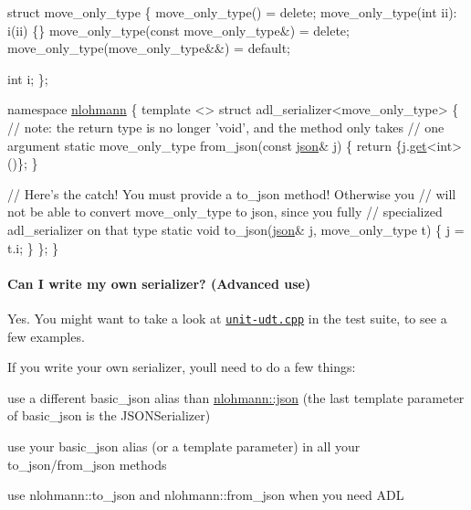 \begin{DoxyCode}
\textcolor{keyword}{struct }move\_only\_type \{
    move\_only\_type() = \textcolor{keyword}{delete};
    move\_only\_type(\textcolor{keywordtype}{int} ii): i(ii) \{\}
    move\_only\_type(\textcolor{keyword}{const} move\_only\_type&) = \textcolor{keyword}{delete};
    move\_only\_type(move\_only\_type&&) = \textcolor{keywordflow}{default};

    \textcolor{keywordtype}{int} i;
\};

\textcolor{keyword}{namespace }\hyperlink{namespacenlohmann}{nlohmann} \{
    \textcolor{keyword}{template} <>
    \textcolor{keyword}{struct }adl\_serializer<move\_only\_type> \{
        \textcolor{comment}{// note: the return type is no longer 'void', and the method only takes}
        \textcolor{comment}{// one argument}
        \textcolor{keyword}{static} move\_only\_type from\_json(\textcolor{keyword}{const} \hyperlink{classnlohmann_1_1basic__json}{json}& j) \{
            \textcolor{keywordflow}{return} \{j.\hyperlink{classnlohmann_1_1basic__json_a6b187a22994c12c8cae0dd5ee99dc85e}{get}<\textcolor{keywordtype}{int}>()\};
        \}

        \textcolor{comment}{// Here's the catch! You must provide a to\_json method! Otherwise you}
        \textcolor{comment}{// will not be able to convert move\_only\_type to json, since you fully}
        \textcolor{comment}{// specialized adl\_serializer on that type}
        \textcolor{keyword}{static} \textcolor{keywordtype}{void} to\_json(\hyperlink{classnlohmann_1_1basic__json}{json}& j, move\_only\_type t) \{
            j = t.i;
        \}
    \};
\}
\end{DoxyCode}


\paragraph*{Can I write my own serializer? (Advanced use)}

Yes. You might want to take a look at \href{https://github.com/nlohmann/json/blob/develop/test/src/unit-udt.cpp}{\tt {\ttfamily unit-\/udt.\+cpp}} in the test suite, to see a few examples.

If you write your own serializer, you\textquotesingle{}ll need to do a few things\+:


\begin{DoxyItemize}
\item use a different {\ttfamily basic\+\_\+json} alias than {\ttfamily \hyperlink{namespacenlohmann_a2bfd99e845a2e5cd90aeaf1b1431f474}{nlohmann\+::json}} (the last template parameter of {\ttfamily basic\+\_\+json} is the {\ttfamily J\+S\+O\+N\+Serializer})
\item use your {\ttfamily basic\+\_\+json} alias (or a template parameter) in all your {\ttfamily to\+\_\+json}/{\ttfamily from\+\_\+json} methods
\item use {\ttfamily nlohmann\+::to\+\_\+json} and {\ttfamily nlohmann\+::from\+\_\+json} when you need A\+DL
\end{DoxyItemize}

